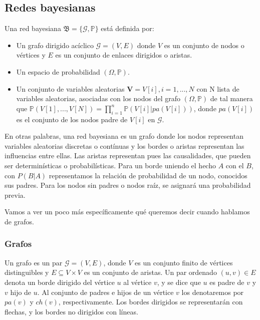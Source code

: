 \subsection{Redes bayesianas}
\begin{definicion} \label{def:BN}
Una red bayesiana \cite{def-bncn} $\mathfrak{B} = \lbrace \mathcal{G}, \mathbb{P} \rbrace$ está definida por:
\begin{itemize}
    \item Un grafo dirigido acíclico $\mathcal{G}=(V,E)$ donde $V$ es un conjunto de nodos o vértices y $E$ 
    es un conjunto de enlaces dirigidos o aristas.
    \item Un espacio de probabilidad $(\Omega, \mathbb{P})$.
    \item Un conjunto de variables aleatorias $\textbf{V}=V[i], i=1,...,N$ con N lista de variables aleatorias, 
    asociadas con los nodos del grafo $(\Omega, \mathbb{P})$ 
    de tal manera que $\mathbb{P}(V[1],...,V[N])= \prod_{i=1}^{n}\mathbb{P}(V[i]|pa(V[i]))$, donde $pa(V[i])$ es el 
    conjunto de los nodos padre de $V[i]$ en $\mathcal{G}$.  
\end{itemize}
\end{definicion}

En otras palabras, una red bayesiana es un grafo donde los nodos representan variables aleatorias discretas 
o contínuas y los bordes o aristas representan las influencias entre ellas. Las aristas 
representan pues las causalidades, que pueden ser determinísticas o probabilísticas. Para un borde 
uniendo el hecho $A$ con el $B$, con $P(B|A)$ representamos la relación de probabilidad de un 
nodo, conocidos sus padres. Para los nodos sin padres o nodos raíz, se asignará una probabilidad previa.

Vamos a ver un poco más específicamente qué queremos decir cuando hablamos de grafos.
\subsubsection{Grafos}
\begin{definicion} \label{def:grafo}
Un grafo es un par $\mathcal{G} = (V, E)$, donde $V$ es un conjunto finito de vértices distinguibles y 
$E \subseteq V \times V$ es un conjunto de aristas. Un par ordenado $(u, v) \in E$ denota un borde dirigido
del vértice $u$ al vértice $v$, y se dice que $u$ es padre de $v$ y $v$ hijo de $u$. Al conjunto de padres 
e hijos de un vértice $v$ los denotaremos por $pa(v)$ y $ch(v)$, respectivamente. Los bordes dirigidos 
se representarán con flechas, y los bordes no dirigidos con líneas. 
\end{definicion}

